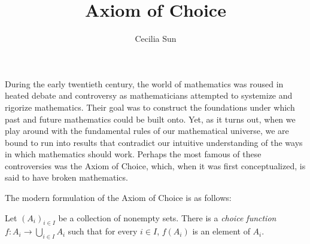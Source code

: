 \documentclass{article}
\title{Axiom of Choice}
\author{Cecilia Sun}
\begin{document}
\maketitle
During the early twentieth century, the world of mathematics was roused in heated debate and controversy as mathematicians attempted to systemize and rigorize mathematics. Their goal was to construct the foundations under which past and future mathematics could be built onto. Yet, as it turns out, when we play around with the fundamental rules of our mathematical universe, we are bound to run into results that contradict our intuitive understanding of the ways in which mathematics should work. Perhaps the most famous of these controversies was the Axiom of Choice, which, when it was first conceptualized, is said to have broken mathematics. 

The modern formulation of the Axiom of Choice is as follows:

Let $(A_i)_{i\in I}$ be a collection of nonempty sets. There is a \textit{choice function} $f:A_i\to \bigcup_{i\in I}A_i$ such that for every $i\in I$, $f(A_i)$ is an element of $A_i$.
\end{document}

